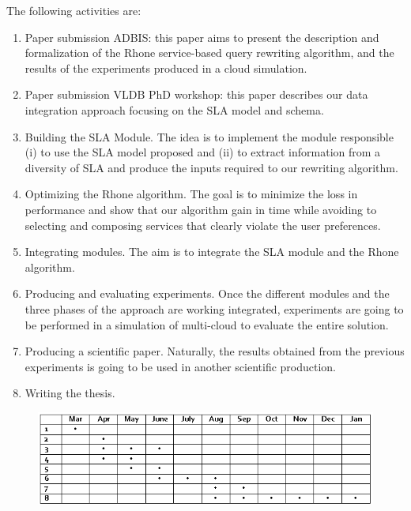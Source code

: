 \documentclass[11pt,a4paper,oneside]{report}
\begin{document}
The following activities are:
\begin{enumerate}
\item Paper submission ADBIS: this paper aims to present the description and formalization of the Rhone service-based query rewriting algorithm, and the results of the experiments produced in a cloud simulation.
\item Paper submission VLDB PhD workshop: this paper describes our data integration approach focusing on the SLA model and schema.
\item Building the SLA Module. The idea is to implement the module responsible (i) to use the SLA model proposed and (ii) to extract information from a diversity of SLA and produce the inputs required to our rewriting algorithm.
\item Optimizing the Rhone algorithm. The goal is to minimize the loss in performance and show that our algorithm gain in time while avoiding to selecting and composing services that clearly violate the user preferences.
\item Integrating modules. The aim is to integrate the SLA module and the Rhone algorithm.
\item Producing and evaluating experiments. Once the different modules and the three phases of the approach are working integrated, experiments are going to be performed in a simulation of multi-cloud to evaluate the entire solution.
\item Producing a scientific paper. Naturally, the results obtained from the previous experiments is going to be used in another scientific production.
\item Writing the thesis.
\end{enumerate}

\begin{figure}[h!]
\center
\includegraphics[scale=1]{calendar.png}
\end{figure}



\end{document}

